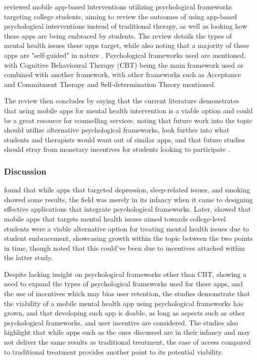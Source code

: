 \documentclass[12pt]{article}
\begin{document}
\textcite{RefWorks:RefID:75-oliveira2021effectiveness} reviewed mobile app-based 
interventions utilizing psychological frameworks targeting college students, aiming to review the outcomes of 
using app-based psychological interventions instead of traditional therapy, as well as looking how these apps are 
being embraced by students. The review details the types of mental health issues these apps target, while also 
noting that a majority of these apps are "self-guided" in nature 
\autocite{RefWorks:RefID:75-oliveira2021effectiveness}. Psychological frameworks used are mentioned, with 
Cognitive Behavioural Therapy (CBT) being 
the main framework used or combined with another framework, with other frameworks such as 
Acceptance and Commitment Therapy and Self-determination Theory mentioned. \newline

The review then concludes by saying that the current literature demonstrates that using mobile apps for mental
health intervention is a viable option and could be a great resource for
counselling services, noting that future work into the topic should utilize alternative psychological
frameworks, look further into what students and therapists would want out of similar apps, and that
future studies should stray from monetary incentives for students looking to participate
\autocite{RefWorks:RefID:75-oliveira2021effectiveness}.

\subsubsection{Discussion}
\textcite{RefWorks:RefID:87-weisel2019standalone} found that while apps that targeted
depression, sleep-related issues, and smoking showed some results, the field was merely in its infancy when it
came to designing effective applications that integrate psychological frameworks. Later, 
\textcite{RefWorks:RefID:75-oliveira2021effectiveness} showed that mobile apps 
that targets mental health issues aimed towards college-level students were a viable alternative option for 
treating mental health issues due to student embracement, showcasing growth within the topic between the two points
in time, though noted that this could've been due to incentives attached within the latter study. \newline

Despite lacking insight on psychological frameworks other than CBT,
showing a need to expand the types of psychological frameworks used for these apps, and the use of incentives 
which may bias user retention, the studies demonstrate that the viability of a mobile mental health app
using psychological frameworks has grown, and that developing such app is doable, as long
as aspects such as other psychological frameworks, and user incentive are considered. The studies also highlight that
while apps such as the ones discussed are in their infancy and may not deliver the same results as traditional treatment, the
ease of access compared to traditional treatment provides another point to its potential viability. \newline
\end{document}
